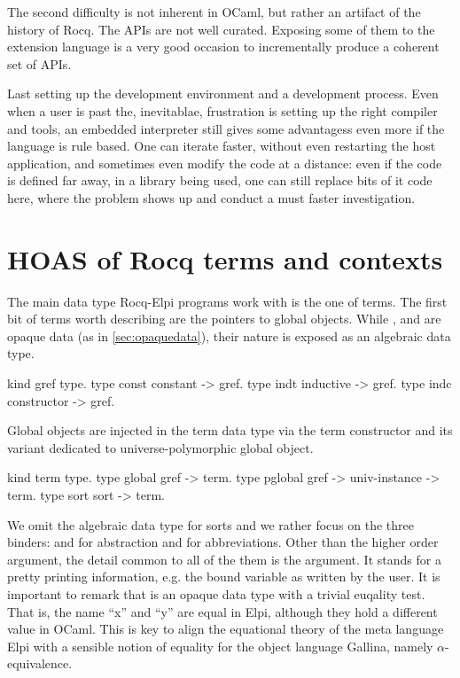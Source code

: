\documentclass[a4paper, 11pt]{book}
\begin{document}
The second difficulty is not inherent in OCaml, but rather an artifact of the
history of Rocq. The APIs are not well curated. Exposing some of them to
the extension language is a very good occasion to incrementally produce
a coherent set of APIs.

Last setting up the development environment and a development
process. Even when a user is past the, inevitablae, frustration
is setting up the right compiler and tools, an embedded
interpreter still gives some advantagess even more if the
language is rule based. One can iterate faster, without even
restarting the host application, and sometimes even modify
the code at a distance: even if the code is defined far away,
in a library being used, one can still replace bits of it code
here, where the problem shows up and conduct a must faster investigation.

\section{HOAS of Rocq terms and contexts}\label{GALLINA}

The main data type Rocq-Elpi programs work with is the one of
terms. The first bit of terms worth describing are the pointers
to global objects. While , 
 and  are opaque
data (as in \ref{sec:opaquedata}), their nature is exposed as
an algebraic data type.

\begin{elpicode}
kind gref type.
type const constant -> gref.            %
type indt  inductive -> gref.           %
type indc  constructor -> gref.         %
\end{elpicode}

Global objects are injected in the term data type via the
 term constructor and its variant
 dedicated to universe-polymorphic global
object.

\begin{elpicode}
kind term type.
type global  gref -> term.
type pglobal gref -> univ-instance -> term.
type sort    sort -> term.                 %
\end{elpicode}

We omit the algebraic data type for sorts and we rather focus on the
three binders:  and  for abstraction
and  for abbreviations.
Other than the higher order argument, the detail common
to all of the them is the  argument. It stands for
a pretty printing information, e.g. the bound variable as written by
the user. It is important to remark that  is
an opaque data type with a trivial euqality test. That is, the
name ``x'' and ``y'' are equal in Elpi, although they hold a
different value in OCaml. This is key to align the equational theory
of the meta language Elpi with a sensible notion of equality for
the object language Gallina, namely $\alpha$-equivalence.
\end{document}
